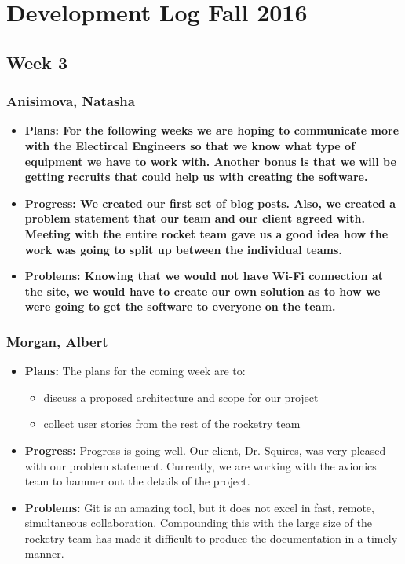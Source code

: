 \documentclass[10pt,draftclsnofoot,onecolumn]{IEEEtran}
\begin{document}
\section{Development Log Fall 2016}

\subsection{Week 3}
\subsubsection{Anisimova, Natasha}
\begin{itemize}
	\item \textbf{Plans: For the following weeks we are hoping to communicate more with the Electircal Engineers so that
		we know what type of equipment we have to work with. Another bonus is that we will be getting recruits that could
		help us with creating the software.}
	\item \textbf{Progress: We created our first set of blog posts. Also, we created a problem statement that our team
		and our client agreed with. Meeting with the entire rocket team gave us a good idea how the work was going to split up
		between the individual teams. }
	\item \textbf{Problems: Knowing that we would not have Wi-Fi connection at the site, we would have to create our own
		solution as to how we were going to get the software to everyone on the team.}
\end{itemize}
\subsubsection{Morgan, Albert}
\begin{itemize}
	\item \textbf{Plans: }
	The plans for the coming week are to:
	\begin{itemize}
		\item discuss a proposed architecture and scope for our project
		\item collect user stories from the rest of the rocketry team
	\end{itemize}
	\item \textbf{Progress: }
	Progress is going well. Our client, Dr. Squires, was very pleased with our problem statement. Currently, we are working with the avionics team to hammer out the details of the project.
	\item \textbf{Problems: }
	Git is an amazing tool, but it does not excel in fast, remote, simultaneous collaboration. Compounding this with the large size of the rocketry team has made it difficult to produce the documentation in a timely manner.
\end{itemize}
\end{document}
